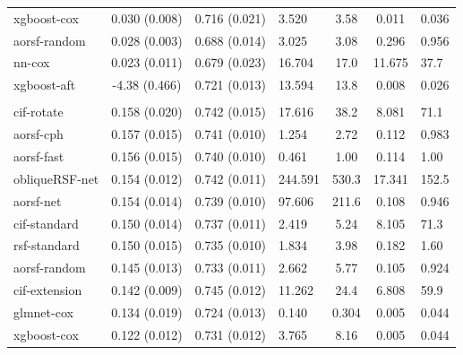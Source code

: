 \documentclass[twoside,11pt]{article}\usepackage[]{graphicx}\usepackage[]{xcolor}
\newenvironment{knitrout}{}{} %
\begin{document}
\begin{knitrout}
\begin{longtable}{lcclccl}
\hspace{1em}xgboost-cox & 0.030 (0.008) & 0.716 (0.021) & 3.520 & 3.58 & 0.011 & 0.036\\
\hspace{1em}aorsf-random & 0.028 (0.003) & 0.688 (0.014) & 3.025 & 3.08 & 0.296 & 0.956\\
\hspace{1em}nn-cox & 0.023 (0.011) & 0.679 (0.023) & 16.704 & 17.0 & 11.675 & 37.7\\
\hspace{1em}xgboost-aft & -4.38 (0.466) & 0.721 (0.013) & 13.594 & 13.8 & 0.008 & 0.026\\
\addlinespace[0.3em]
\hline
\multicolumn{7}{l}{\textit{\textbf{Monoclonal gammopathy; death, n = 1384, p = 8}}}\\
\hline
\hspace{1em}cif-rotate & 0.158 (0.020) & 0.742 (0.015) & 17.616 & 38.2 & 8.081 & 71.1\\
\hspace{1em}aorsf-cph & 0.157 (0.015) & 0.741 (0.010) & 1.254 & 2.72 & 0.112 & 0.983\\
\hspace{1em}aorsf-fast & 0.156 (0.015) & 0.740 (0.010) & 0.461 & 1.00 & 0.114 & 1.00\\
\hspace{1em}obliqueRSF-net & 0.154 (0.012) & 0.742 (0.011) & 244.591 & 530.3 & 17.341 & 152.5\\
\hspace{1em}aorsf-net & 0.154 (0.014) & 0.739 (0.010) & 97.606 & 211.6 & 0.108 & 0.946\\
\hspace{1em}cif-standard & 0.150 (0.014) & 0.737 (0.011) & 2.419 & 5.24 & 8.105 & 71.3\\
\hspace{1em}rsf-standard & 0.150 (0.015) & 0.735 (0.010) & 1.834 & 3.98 & 0.182 & 1.60\\
\hspace{1em}aorsf-random & 0.145 (0.013) & 0.733 (0.011) & 2.662 & 5.77 & 0.105 & 0.924\\
\hspace{1em}cif-extension & 0.142 (0.009) & 0.745 (0.012) & 11.262 & 24.4 & 6.808 & 59.9\\
\hspace{1em}glmnet-cox & 0.134 (0.019) & 0.724 (0.013) & 0.140 & 0.304 & 0.005 & 0.044\\
\hspace{1em}xgboost-cox & 0.122 (0.012) & 0.731 (0.012) & 3.765 & 8.16 & 0.005 & 0.044\\

\end{longtable}
\end{knitrout}
\end{document}
